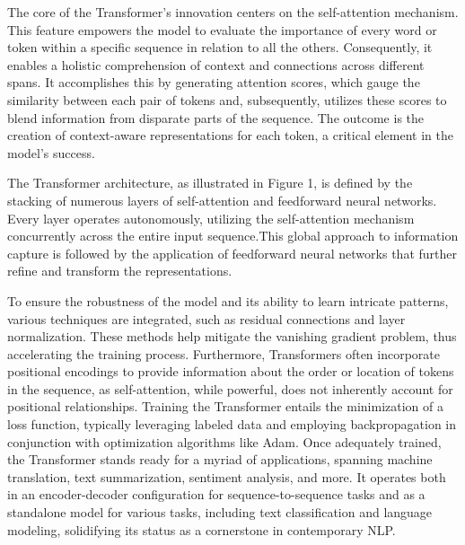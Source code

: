 \documentclass[fleqn,10pt]{thescipub} %
\begin{document}
The core of the Transformer's innovation centers on the self-attention mechanism. This feature empowers the model to evaluate the importance of every word or token within a specific sequence in relation to all the others. Consequently, it enables a holistic comprehension of context and connections across different spans. It accomplishes this by generating attention scores, which gauge the similarity between each pair of tokens and, subsequently, utilizes these scores to blend information from disparate parts of the sequence. The outcome is the creation of context-aware representations for each token, a critical element in the model's success.

The Transformer architecture, as illustrated in Figure 1, is defined by the stacking of numerous layers of self-attention and feedforward neural networks. Every layer operates autonomously, utilizing the self-attention mechanism concurrently across the entire input sequence.This global approach to information capture is followed by the application of feedforward neural networks that further refine and transform the representations.


To ensure the robustness of the model and its ability to learn intricate patterns, various techniques are integrated, such as residual connections and layer normalization. These methods help mitigate the vanishing gradient problem, thus accelerating the training process. Furthermore, Transformers often incorporate positional encodings to provide information about the order or location of tokens in the sequence, as self-attention, while powerful, does not inherently account for positional relationships.
Training the Transformer entails the minimization of a loss function, typically leveraging labeled data and employing backpropagation in conjunction with optimization algorithms like Adam. Once adequately trained, the Transformer stands ready for a myriad of applications, spanning machine translation, text summarization, sentiment analysis, and more. It operates both in an encoder-decoder configuration for sequence-to-sequence tasks and as a standalone model for various tasks, including text classification and language modeling, solidifying its status as a cornerstone in contemporary NLP.
\end{document}
